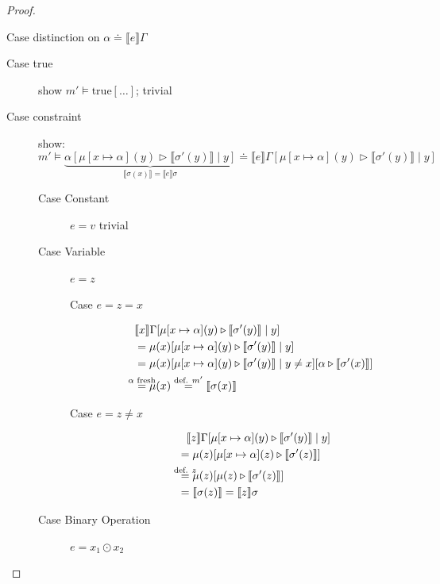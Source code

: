 \documentclass[twoside, english]{sdqthesis}
\newcommand{\bbracket}[1]{\llbracket #1 \rrbracket}
\newcommand{\tr}[0]{\triangleright}
\theoremstyle{definition}
\begin{document}
\begin{proof}
\begin{description}
      Case distinction on $\alpha \doteq \bbracket{e}\Gamma$

      \begin{description}
        \item[Case true] show $m' \vDash \text{true}[\dots]$; trivial
        \item[Case constraint] show:
          $$ m' \vDash 
            \underbrace{\alpha[\mu[x\mapsto \alpha](y) \tr \bbracket{\sigma'(y)} \mid y]}_{\bbracket{\sigma(x)}=\bbracket{e}\sigma}
            \doteq 
            \bbracket{e}\Gamma[\mu[x\mapsto \alpha](y) \tr \bbracket{\sigma'(y)} \mid y]
          $$
          \begin{description}
            \item[Case Constant] $e=v$ trivial
            \item[Case Variable] $e=z$
              \begin{description}
                \item[Case $e=z=x$] 
                  \begin{align*}
                    &\bbracket{x}\Gamma[\mu[x\mapsto \alpha](y) \tr \bbracket{\sigma'(y)} \mid y]
                    \\ &= \mu(x)[\mu[x\mapsto \alpha](y) \tr \bbracket{\sigma'(y)} \mid y]
                    \\ &= \mu(x)[\mu[x\mapsto \alpha](y) \tr \bbracket{\sigma'(y)} \mid y \neq x][\alpha \tr \bbracket{\sigma'(x)} ]
                    \\ &\overset{\mathclap{\alpha \text{ fresh}}}{=} \mu(x) 
                      \overset{\text{def. } m'}{=} \bbracket{\sigma(x)}
                  \end{align*}
                \item[Case $e = z \neq x$]
                  \begin{align*}
                    &\phantom{=} \bbracket{z}\Gamma[\mu[x\mapsto \alpha](y) \tr \bbracket{\sigma'(y)} \mid y]
                    \\ &= \mu(z)[\mu[x\mapsto \alpha](z) \tr \bbracket{\sigma'(z)}]
                    \\ &\overset{\mathclap{\text{def. } z}}{=} \mu(z)[\mu(z) \tr \bbracket{\sigma'(z)}]
                    \\ &=\bbracket{\sigma(z)} = \bbracket{z}\sigma
                  \end{align*}
              \end{description}
            \item[Case Binary Operation] $e = x_1 \odot x_2$

\end{description}
\end{description}
\end{description}
\end{proof}
\end{document}
